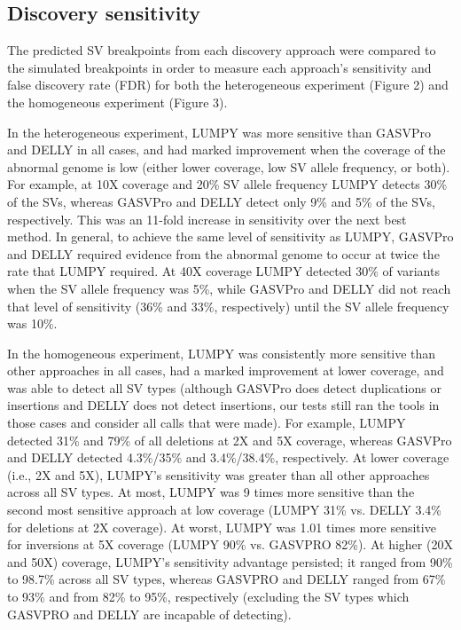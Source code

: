 \documentclass[10pt]{bmc_article}
\newenvironment{bmcformat}{\begin{raggedright}\baselineskip20pt\sloppy\setboolean{publ}{false}}{\end{raggedright}\baselineskip20pt\sloppy}
\begin{document}
\begin{bmcformat}
\subsection*{Discovery sensitivity}
The predicted SV breakpoints from each discovery approach were compared to the
simulated breakpoints in order to measure each approach’s sensitivity and false
discovery rate (FDR) for both the heterogeneous experiment (Figure 2) and the
homogeneous experiment (Figure 3).

In the heterogeneous experiment, LUMPY was more sensitive than GASVPro and DELLY
in all cases, and had marked improvement when the coverage of the abnormal
genome is low (either lower coverage, low SV allele frequency, or both).  For
example, at 10X coverage and 20\% SV allele frequency LUMPY detects 30\% of the
SVs, whereas GASVPro and DELLY detect only 9\% and 5\% of the SVs, respectively.
This was an 11-fold increase in sensitivity over the next best method.  In
general, to achieve the same level of sensitivity as LUMPY, GASVPro and DELLY
required evidence from the abnormal genome to occur at twice the rate that LUMPY
required.  At 40X coverage LUMPY detected 30\% of variants when the SV allele
frequency was 5\%, while GASVPro and DELLY did not reach that level of
sensitivity (36\% and 33\%, respectively) until the SV allele frequency was
10\%.

In the homogeneous experiment, LUMPY was consistently more sensitive than other
approaches in all cases, had a marked improvement at lower coverage, and was
able to detect all SV types (although GASVPro does detect duplications or
insertions and DELLY does not detect insertions, our tests still ran the tools
in those cases and consider all calls that were made).  For example, LUMPY
detected 31\% and 79\% of all deletions at 2X and 5X coverage, whereas GASVPro
and DELLY detected 4.3\%/35\% and 3.4\%/38.4\%, respectively.  At lower coverage
(i.e., 2X and 5X), LUMPY’s sensitivity was greater than all other approaches
across all SV types. At most, LUMPY was 9 times more sensitive than the second
most sensitive approach at low coverage (LUMPY 31\% vs. DELLY 3.4\% for
deletions at 2X coverage). At worst, LUMPY was 1.01 times more sensitive for
inversions at 5X coverage (LUMPY 90\% vs.  GASVPRO 82\%). At higher (20X and
50X) coverage, LUMPY’s sensitivity advantage persisted; it ranged from 90\% to
98.7\% across all SV types, whereas GASVPRO and DELLY ranged from 67\% to 93\%
and from 82\% to 95\%, respectively (excluding the SV types which GASVPRO and
DELLY are incapable of detecting).  



\end{bmcformat}
\end{document}
